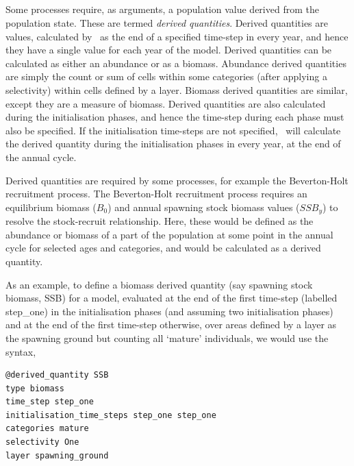 \subsection{\label{sec:derived-quantities}}

Some processes require, as arguments, a population value derived from the population state. These are termed \emph{derived quantities}. Derived quantities are values, calculated by \SPM\ as the end of a specified time-step in every year, and hence they have a single value for each year of the model. Derived quantities can be calculated as either an abundance or as a biomass. Abundance derived quantities are simply the count or sum of cells within some categories (after applying a selectivity) within cells defined by a layer. Biomass derived quantities are similar, except they are a measure of biomass. Derived quantities are also calculated during the initialisation phases, and hence the time-step during each phase must also be specified. If the initialisation time-steps are not specified, \SPM\ will calculate the derived quantity during the initialisation phases in every year, at the end of the annual cycle.

Derived quantities are required by some processes, for example the Beverton-Holt recruitment process. The Beverton-Holt recruitment process requires an equilibrium biomass ($B_0$) and annual spawning stock biomass values ($SSB_y$) to resolve the stock-recruit relationship. Here, these would be defined as the abundance or biomass of a part of the population at some point in the annual cycle for selected ages and categories, and would be calculated as a derived quantity.

As an example, to define a biomass derived quantity (say spawning stock biomass, SSB) for a model, evaluated at the end of the first time-step (labelled step\_one) in the initialisation phases (and assuming two initialisation phases) and at the end of the first time-step otherwise, over areas defined by a layer as the spawning ground but counting all `mature' individuals, we would use the syntax,

{\small{\begin{verbatim}
@derived_quantity SSB
type biomass
time_step step_one
initialisation_time_steps step_one step_one
categories mature
selectivity One
layer spawning_ground
\end{verbatim}}}

\subsection{\label{sec:derived-layers}}

